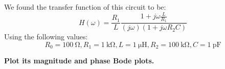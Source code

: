 

\begin{center}

\end{center}
  
We found the transfer function of this circuit to be:
$$H(\omega) = \frac{R_1}{L} \frac{1 + j\omega \frac{L}{R_1}}{(j\omega)(1 + j\omega R_2 C)}$$
Using the following values:
$$R_0 = \SI{100}{\ohm}, R_1 = \SI{1}{\kilo\ohm}, L = \SI{1}{\micro\henry}, R_2 = \SI{100}{\kilo\ohm}, C = \SI{1}{\pico\farad}$$

\textbf{Plot its magnitude and phase Bode plots.}

  
    
